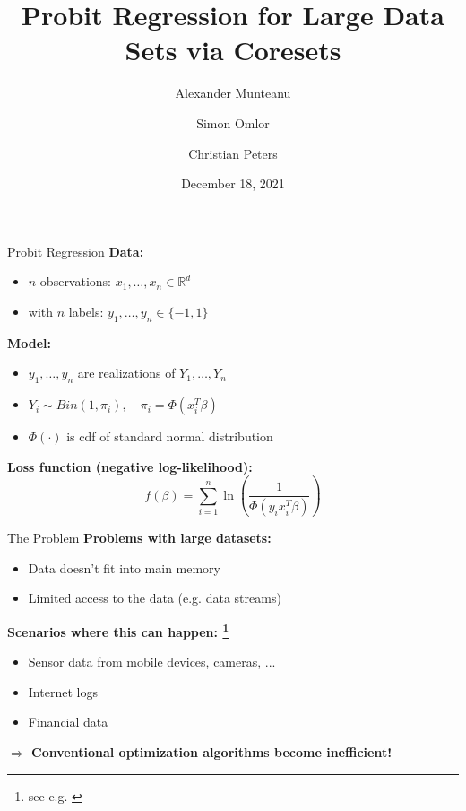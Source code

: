 \documentclass[gray]{beamer}
\title{Probit Regression for Large Data Sets via Coresets}
\author{Alexander Munteanu \and Simon Omlor \and Christian Peters}
\institute{TU Dortmund University, Germany}
\date{December 18, 2021}
\begin{document}
\begin{frame}[noframenumbering]
    \thispagestyle{empty}
    \maketitle
\end{frame}

\begin{frame}{Probit Regression}
    \textbf{Data:}
    \begin{itemize}
        \item $n$ observations: $x_1, \ldots, x_n \in \mathbb{R}^d$ \\
        \item with $n$ labels: $y_1, \ldots, y_n \in \{-1, 1\}$
    \end{itemize}

    \vspace{\fill}

    \textbf{Model:}
    \begin{itemize}
        \item $y_1, \ldots, y_n$ are realizations of $Y_1, \ldots, Y_n$
        \item $Y_i \sim Bin(1, \pi_i), \quad \pi_i = \Phi(x_i^T \beta)$
        \item $\Phi(\cdot)$ is cdf of standard normal distribution
    \end{itemize}

    \vspace{\fill}

    \textbf{Loss function (negative log-likelihood):}
    \begin{equation*}
        f(\beta) = \sum_{i=1}^n \ln\left( \frac{1}{\Phi(y_ix_i^T\beta)} \right)
    \end{equation*}
\end{frame}

\begin{frame}{The Problem}
    \textbf{Problems with large datasets:}
    \begin{itemize}
        \item Data doesn't fit into main memory
        \item Limited access to the data (e.g. data streams)
    \end{itemize}

    \vspace{\fill}

    \textbf{Scenarios where this can happen:%
        \footnote{see e.g. \cite{big-data-tiny-data}}}
    \begin{itemize}
        \item Sensor data from mobile devices, cameras, ...
        \item Internet logs
        \item Financial data
    \end{itemize}

    \vspace{\fill}

    \textbf{$\Rightarrow$ Conventional optimization algorithms become inefficient!}
\end{frame}
\end{document}
